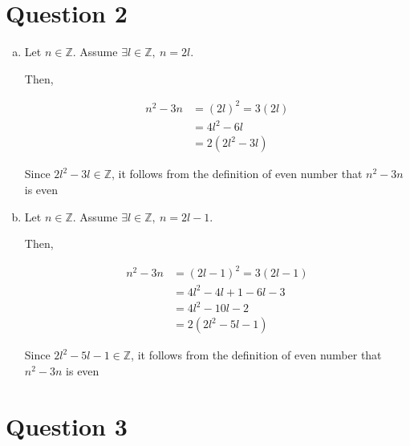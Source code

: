 \documentclass[12pt]{article}
\begin{document}
\section*{Question 2}
\begin{enumerate}[a.]
    \item

    Let $n \in \mathbb{Z}$. Assume $\exists l \in \mathbb{Z},\: n = 2l$.

    \bigbreak

    Then,

    \begin{align}
        n^2 - 3n &= (2l)^2 = 3(2l) \\
        &= 4l^2 - 6l \\
        &= 2(2l^2 - 3l)
    \end{align}

    \bigbreak

    Since $2l^2 - 3l \in \mathbb{Z}$, it follows from the definition of even number
    that $n^2-3n$ is even

    \item

    Let $n \in \mathbb{Z}$. Assume $\exists l \in \mathbb{Z},\: n = 2l - 1$.

    \bigbreak

    Then,

    \setcounter{equation}{0}
    \begin{align}
        n^2 - 3n &= (2l-1)^2 = 3(2l-1)\\
        &= 4l^2 - 4l + 1 - 6l - 3\\
        &= 4l^2 - 10l - 2 \\
        &= 2(2l^2 - 5l - 1)
    \end{align}

    \bigbreak

    Since $2l^2 - 5l - 1 \in \mathbb{Z}$, it follows from the definition of even number
    that $n^2-3n$ is even


\end{enumerate}

\section*{Question 3}
\end{document}
